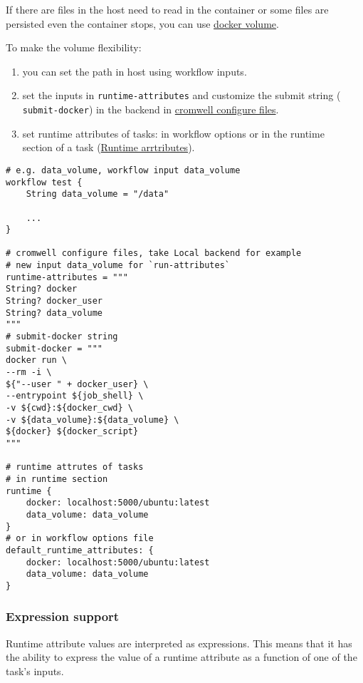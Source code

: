 \documentclass[
]{book}
\providecommand{\tightlist}{%
  \setlength{\itemsep}{0pt}\setlength{\parskip}{0pt}}
\begin{document}
If there are files in the host need to read in the container or some files are
persisted even the container stops, you can use
\href{https://docs.docker.com/storage/volumes/}{docker volume}.

To make the volume flexibility:

\begin{enumerate}
\def\labelenumi{\arabic{enumi}.}
\tightlist
\item
  you can set the path in host using workflow inputs.
\item
  set the inputs in \texttt{runtime-attributes} and customize the submit string (
  \texttt{submit-docker}) in the backend in \href{https://www.github.com/broadinstitute/cromwell/tree/develop/cromwell.example.backends/cromwell.examples.conf}{cromwell configure files}.
\item
  set runtime attributes of tasks: in workflow options or in the runtime\\
  section of a task (\protect\hyperlink{runtime-arrtributes}{Runtime arrtributes}).
\end{enumerate}

\begin{verbatim}
# e.g. data_volume, workflow input data_volume
workflow test {
    String data_volume = "/data"
  
    ...
}

# cromwell configure files, take Local backend for example
# new input data_volume for `run-attributes`
runtime-attributes = """
String? docker
String? docker_user
String? data_volume
"""
# submit-docker string
submit-docker = """
docker run \
--rm -i \
${"--user " + docker_user} \
--entrypoint ${job_shell} \
-v ${cwd}:${docker_cwd} \
-v ${data_volume}:${data_volume} \
${docker} ${docker_script}
"""

# runtime attrutes of tasks
# in runtime section
runtime {
    docker: localhost:5000/ubuntu:latest
    data_volume: data_volume
}
# or in workflow options file
default_runtime_attributes: {
    docker: localhost:5000/ubuntu:latest
    data_volume: data_volume
}
\end{verbatim}

\hypertarget{expression-support}{%
\subsubsection*{Expression support}\label{expression-support}}

Runtime attribute values are interpreted as expressions. This means that it has
the ability to express the value of a runtime attribute as a function of one of
the task's inputs.
\end{document}
